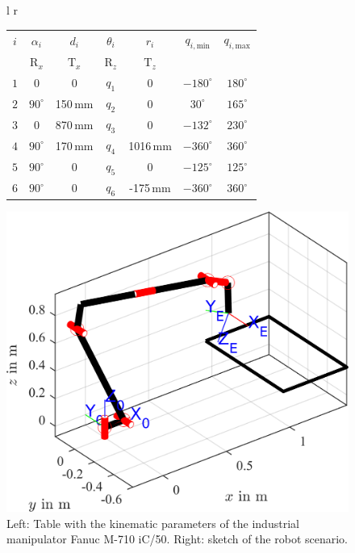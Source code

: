 \documentclass[robotics,article,submit,moreauthors,pdftex]{Definitions/mdpi}
\begin{document}
\begin{figure}[tb]
\begin{tabular}[t]{l r}
		\begin{tabular}[t]{|c|c|c|c|c|c|c|}
			\hline
			$i$ & $\alpha_i$ & $d_i$ & $\theta_i$ & $r_i$ & $q_{i,\mathrm{min}}$ &  $q_{i,\mathrm{max}}$ \\
			& $\mathrm{R}_x$ & $\mathrm{T}_x$ & $\mathrm{R}_z$ & $\mathrm{T}_z$ & &   \\
			\hline
			$1$ & $0$ & $0$ & $q_1$ & $0$ & $-180^\circ$ & $180^\circ$ \\
			$2$ & $90^\circ$ & 150\,mm & $q_2$ & $0$ & $30^\circ$ & $165^\circ$ \\
			$3$ & $0$ & 870\,mm & $q_3$ & $0$ & $-132^\circ$ & $230^\circ$ \\
			$4$ & $90^\circ$ & 170\,mm & $q_4$ & 1016\,mm & $-360^\circ$ & $360^\circ$ \\
			$5$ & $90^\circ$ & $0$ & $q_5$ & $0$ & $-125^\circ$ & $125^\circ$ \\
			$6$ & $90^\circ$ & $0$ & $q_6$ &  -175\,mm & $-360^\circ$ & $360^\circ$ \\
			\hline
		\end{tabular}
    \begin{minipage}[t]{7.5cm}
    	\vspace{0.001cm} %
    	\hspace{1cm}
		\includegraphics[trim=30 30 0 30, clip, scale=0.7]{serrob_traj_zero_pose.png} %
    \end{minipage}
\end{tabular}
\caption{Left: Table with the kinematic parameters of the industrial manipulator Fanuc M-710 iC/50. Right: sketch of the robot scenario.}
\label{tab:mdh_industrialrobot}
\end{figure}
\end{document}
